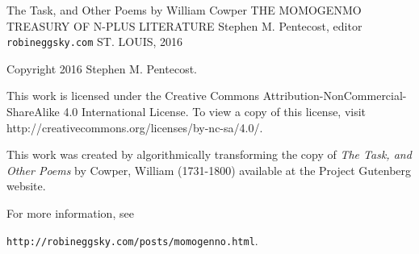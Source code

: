 \documentclass{book}
\begin{document}
{\fontsize{12pt}{14pt}\selectfont
\newpage
\null

\newpage
\begin{center}
{\Huge
\vspace*{10.0mm}
The Task,
\linebreak
\linebreak
and Other Poems
\linebreak
\linebreak
}
\linebreak
\linebreak
{\Large
by
\linebreak
\linebreak
}
{\huge
William Cowper
}
\linebreak
\linebreak
\linebreak
\linebreak
\linebreak
\linebreak
\linebreak
\linebreak
\linebreak
{\Large 
THE MOMOGENMO TREASURY 
\linebreak
\linebreak
OF
\linebreak
\linebreak
N-PLUS LITERATURE
\linebreak
\linebreak
\linebreak
}
{\large 
Stephen M. Pentecost, editor
}
\linebreak
\linebreak
\linebreak
\linebreak
{\LARGE 
\texttt{robineggsky.com}
}
\linebreak
\linebreak
{\Large 
ST. LOUIS, 2016
}
\end{center}

\newpage
\vspace*{1.0in}
Copyright 2016 Stephen M. Pentecost.
\bigbreak
\bigbreak
\bigbreak
\par
This work is licensed under the Creative Commons Attribution-NonCommercial-ShareAlike 4.0 International License. To view a copy of this license, visit http://creativecommons.org/licenses/by-nc-sa/4.0/.
\bigbreak
\par
This work was created by algorithmically transforming the copy of \textit{The Task, and Other Poems} by Cowper, William (1731-1800) available at the Project Gutenberg website.
\bigbreak
\par
For more information, see
\par
\vspace*{0.10in}
\texttt{http://robineggsky.com/posts/momogenno.html}.
\par

}
\end{document}
